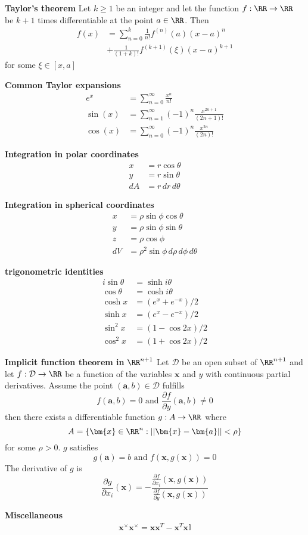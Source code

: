 \textbf{Taylor's theorem} \newline
Let \(k\geq1\) be an integer and let the function \(f:\RR \rightarrow \RR\) be \(k+1\) times differentiable at the point \(a\in\RR\). Then
\begin{align*}
    f(x) &= \sum_{n=0}^{k}\frac{1}{n!}f^{(n)}(a)(x-a)^n \\
     &+ \frac{1}{(1+k)!}f^{(k+1)}(\xi)(x-a)^{k+1}
\end{align*}
for some \(\xi\in[x,a]\) \newline


\textbf{Common Taylor expansions}
\begin{align*}
    e^x &= \sum_{n=0}^{\infty}\frac{x^n}{n!} \\
    \sin(x) &= \sum_{n=1}^{\infty}(-1)^n\frac{x^{2n+1}}{(2n+1)!} \\
    \cos(x) &= \sum_{n=0}^{\infty}(-1)^n\frac{x^{2n}}{(2n)!}
\end{align*}

\textbf{Integration in polar coordinates}
\begin{align*}
    x & = r \cos \theta \\
    y & = r \sin \theta \\
    dA & = r\,dr\,d\theta
\end{align*}

\textbf{Integration in spherical coordinates}
\begin{align*}
    x & = \rho \sin \phi \cos \theta \\
    y & = \rho \sin \phi \sin \theta \\
    z & = \rho \cos \phi \\
    dV &= \rho^2 \sin \phi \, d\rho \, d\phi \, d\theta
\end{align*}

\textbf{trigonometric identities}
\begin{align*}
    i \sin \theta &= \sinh {i\theta} \\
    \cos \theta &= \cosh {i\theta} \\
    \cosh x & = (e^x+e^{-x})/2 \\
    \sinh x & = (e^x-e^{-x})/2 \\
    \sin^2 x & = (1-\cos{2x})/2 \\
    \cos^2 x & = (1+\cos{2x})/2
\end{align*}

\textbf{Implicit function theorem in} \(\RR^{n+1}\) \newline
Let \(\mathcal{D}\) be an open subset of \(\RR^{n+1}\) and let \(f:\mathcal{D}\rightarrow\RR\)
be a function of the variables \(\bm{x}\) and \(y\) with continuous partial derivatives. Assume
the point \((\bm{a},b)\in\mathcal{D}\) fulfills 
\[f(\bm{a},b) = 0 \textrm{ and } \frac{\partial f}{\partial y}(\bm{a},b) \neq 0\]
then there exists a differentiable function \(g:A\rightarrow \RR\) where
\[A=\{\bm{x}\in\RR^n:||\bm{x}-\bm{a}||<\rho\}\]
for some \(\rho > 0\). \(g\) satisfies
\[g(\bm{a})=b \textrm{ and } f(\bm{x},g(\bm{x}))=0\]
The derivative of \(g\) is
\[\frac{\partial g}{\partial x_i}(\bm{x}) = -\frac{\frac{\partial f}{\partial x_i}(\bm{x},g(\bm{x}))}{\frac{\partial f}{\partial y}(\bm{x},g(\bm{x}))}\]


\textbf{Miscellaneous}
\begin{align*}
    \bm{x}^\times\bm{x}^\times = \bm{x}\bm{x}^T - \bm{x}^T\bm{x}\mathbb{I}
\end{align*}
